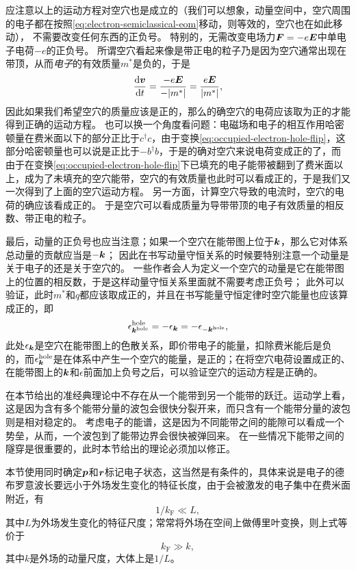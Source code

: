 应注意以上的运动方程对空穴也是成立的（我们可以想象，动量空间中，空穴周围的电子都在按照\eqref{eq:electron-semiclassical-eom}移动，则等效的，空穴也在如此移动），
不需要改变任何东西的正负号。
特别的，无需改变电场力$\vb*{F} = - e \vb*{E}$中单电子电荷$-e$的正负号。
所谓空穴看起来像是带正电的粒子乃是因为空穴通常出现在带顶，从而\emph{电子}的有效质量$m^*$是负的，于是
\begin{equation}
    \dv{\vb*{v}}{t} = \frac{- e \vb*{E}}{- \abs{m^*}} = \frac{e \vb*{E}}{\abs{m^*}},
\end{equation}
因此如果我们希望空穴的质量应该是正的，那么的确空穴的电荷应该取为正的才能得到正确的运动方程。
也可以换一个角度看问题：电磁场和电子的相互作用哈密顿量在费米面以下的部分正比于$c^\dagger c$，由于变换\eqref{eq:occupied-electron-hole-flip}，这部分哈密顿量也可以说是正比于$- b^\dagger b$，于是的确对空穴来说电荷变成正的了，而由于在变换\eqref{eq:occupied-electron-hole-flip}下已填充的电子能带被翻到了费米面以上，成为了未填充的空穴能带，空穴的有效质量也此时可以看成正的，于是我们又一次得到了上面的空穴运动方程。
另一方面，计算空穴导致的电流时，空穴的电荷的确应该看成正的。
于是空穴可以看成质量为导带带顶的电子有效质量的相反数、带正电的粒子。

最后，动量的正负号也应当注意；如果一个空穴在能带图上位于$\vb*{k}$，那么它对体系总动量的贡献应当是$- \vb*{k}$；
因此在书写动量守恒关系的时候要特别注意一个动量是关于电子的还是关于空穴的。
一些作者会人为定义一个空穴的动量是它在能带图上的位置的相反数，于是这样动量守恒关系里面就不需要考虑正负号；
此外可以验证，此时$m^*$和$q$都应该取成正的，并且在书写能量守恒定律时空穴能量也应该算成正的，即
\begin{equation}
    \epsilon^{\text{hole}}_{\vb*{k}^{\text{hole}}} = - \epsilon_{\vb*{k}}
    = - \epsilon_{- \vb*{k}^{\text{hole}}},
\end{equation}
此处$\epsilon_{\vb*{k}}$是空穴在能带图上的色散关系，即价带电子的能量，扣除费米能后是负的，而$\epsilon^{\text{hole}}_{\vb*{k}}$是在体系中产生一个空穴的能量，是正的；在将空穴电荷设置成正的、在能带图上的$\vb*{k}$和$\epsilon$前面加上负号之后，可以验证空穴的运动方程是正确的。

在本节给出的准经典理论中不存在从一个能带到另一个能带的跃迁。运动学上看，这是因为含有多个能带分量的波包会很快分裂开来，而只含有一个能带分量的波包则是相对稳定的。
考虑电子的能谱，这是因为不同能带之间的能隙可以看成一个势垒，从而，一个波包到了能带边界会很快被弹回来。
在一些情况下能带之间的隧穿是很重要的，此时本节给出的理论必须加以修正。

本节使用同时确定$\vb*{p}$和$\vb*{r}$标记电子状态，这当然是有条件的，具体来说是电子的德布罗意波长要远小于外场发生变化的特征长度，由于会被激发的电子集中在费米面附近，有
\begin{equation}
    1 / k_\text{F} \ll L,
\end{equation}
其中$L$为外场发生变化的特征尺度；常常将外场在空间上做傅里叶变换，则上式等价于
\begin{equation}
    k_\text{F} \gg k,
\end{equation}
其中$k$是外场的动量尺度，大体上是$1/L$。

